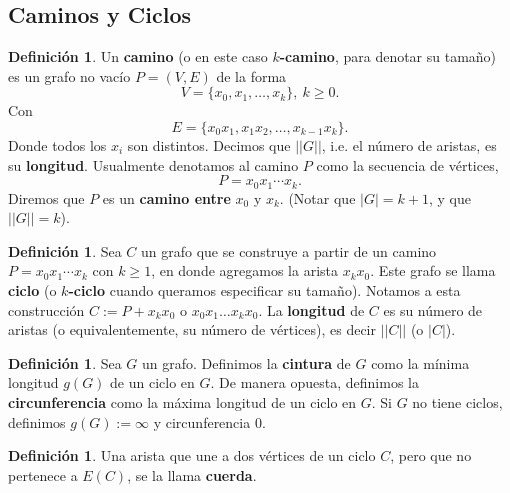 \documentclass[12pt]{report}
\theoremstyle{plain}
\theoremstyle{definition}
\newtheorem{definition}[theorem]{Definición}
\newenvironment{Definition}{\colorlet{shadecolor}{Apricot!12} \begin{shaded} \begin{definition} }{ \end{definition} \end{shaded} }
\newcommand{\abs}[1]{\left \vert #1 \right \vert}
\newcommand{\Abs}[1]{\left \vert \left \vert #1 \right \vert \right \vert}
\begin{document}
\subsection{Caminos y Ciclos}

\begin{Definition}
Un \textbf{camino} (o en este caso \textbf{$k$-camino}, para denotar su tamaño) es un grafo no vacío $P = (V,E)$ de la forma
$$
V = \{ x_0,x_1,\ldots,x_k\}, \ k \geq 0.
$$
Con
$$
E = \{ x_0x_1, x_1x_2,\ldots,x_{k-1} x_k\}.
$$
Donde todos los $x_i$ son distintos. Decimos que $\Abs G$, i.e. el número de aristas, es su \textbf{longitud}. Usualmente denotamos al camino $P$ como la secuencia de vértices,
$$
P = x_0 x_1 \cdots x_k.
$$
Diremos que $P$ es un \textbf{camino entre} $x_0$ y $x_k$. (Notar que $\abs G = k+1$, y que $\Abs G = k$).
\end{Definition}






\begin{definition}
Sea $C$ un grafo que se construye a partir de un camino $P = x_0x_1\cdots x_k$ con $k \geq 1$, en donde agregamos la arista $x_kx_0$. Este grafo se llama \textbf{ciclo} (o \textbf{$k$-ciclo} cuando queramos especificar su tamaño). Notamos a esta construcción $C:= P + x_k x_0$ o $x_0 x_1 \ldots x_k x_0$. La \textbf{longitud} de $C$ es su número de aristas (o equivalentemente, su número de vértices), es decir $\Abs C$ (o $\abs C$).
\end{definition}


\begin{definition}
Sea $G$ un grafo. Definimos la \textbf{cintura} de $G$ como la mínima longitud $g(G)$ de un ciclo en $G$. De manera opuesta, definimos la \textbf{circunferencia} como la máxima longitud de un ciclo en $G$. Si $G$ no tiene ciclos, definimos $g(G):= \infty$ y circunferencia $0$.
\end{definition}





\begin{definition}
Una arista que une a dos vértices de un ciclo $C$, pero que no pertenece a $E(C)$, se la llama \textbf{cuerda}.
\end{definition}
\end{document}
